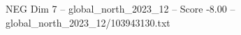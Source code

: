 \begin{textsample}{NEG Dim 7 – global\_north\_2023\_12 – Score -8.00 – global\_north\_2023\_12/103943130.txt}
\end{textsample}
